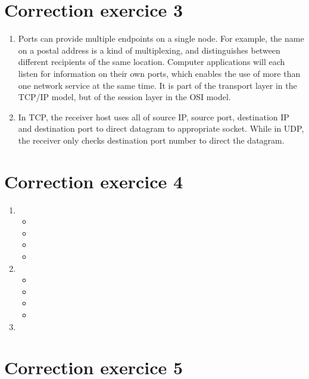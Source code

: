 \documentclass[a4paper, 11pt, titlepage]{article}
\begin{document}
\section{Correction exercice 3}
\begin{enumerate}[label=(\alph*)]
\item
Ports can provide multiple endpoints on a single node. For example, the name on a postal address is a kind of multiplexing, and distinguishes between different recipients of the same location. Computer applications will each listen for information on their own ports, which enables the use of more than one network service at the same time. It is part of the transport layer in the TCP/IP model, but of the session layer in the OSI model.

\item 
In TCP, the receiver host uses all of source IP, source port, destination IP and destination port to direct datagram to appropriate socket. While in UDP, the receiver only checks destination port number to direct the datagram.


\end{enumerate}

\section{Correction exercice 4}
\begin{enumerate}[label=(\alph*)]
\item
\begin{itemize}
\item 
\item 
\item 
\item
\end{itemize}

\item 
\begin{itemize}
\item 
\item 
\item 
\item
\end{itemize}

\item 

\end{enumerate}

\section{Correction exercice 5}
\end{document}

